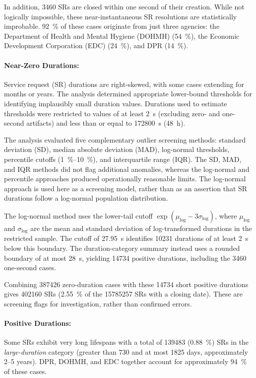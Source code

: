 \documentclass[linenumber]{jdsart}
\begin{document}
In addition, \num{3460} SRs are closed within one second of their 
creation. While not logically impossible, these near-instantaneous 
SR resolutions are statistically improbable. \SI{92}{\percent} of these cases 
originate from just three agencies: the Department of Health and 
Mental Hygiene (DOHMH) (\SI{54}{\percent}), the Economic Development
Corporation (EDC) (\SI{24}{\percent}), and DPR (\SI{14}{\percent}).

\paragraph{Near-Zero Durations:}
\label{par:suspiciousdurations}
Service request (\textsc{SR}) durations are right-skewed,
with some cases extending for months or years.
The analysis determined appropriate lower-bound thresholds
for identifying implausibly small duration values.
Durations used to estimate thresholds were restricted to values of at least
\SI{2}{\second} (excluding zero- and one-second artifacts)
and less than or equal to \SI{172800}{\second}
(\SI{48}{\hour}). 

The analysis evaluated five complementary outlier screening methods:
standard deviation (SD), median absolute deviation (MAD),
log-normal thresholds, percentile cutoffs
(\SIrange{1}{10}{\percent}), and interquartile range (IQR).
The SD, MAD, and IQR methods did not flag additional anomalies,
whereas the log-normal and percentile approaches produced
operationally reasonable limits. The log-normal approach is 
used here as a screening model, rather than as an assertion 
that SR durations follow a log-normal population distribution.

The log-normal method uses the lower-tail cutoff
$\exp(\mu_{\log} - 3\sigma_{\log})$, where $\mu_{\log}$ and
$\sigma_{\log}$ are the mean and standard deviation of log-transformed
durations in the restricted sample. The cutoff of \SI{27.95}{\second}
identifies \num{10231} durations of at least \SI{2}{\second} below
this boundary. The duration-category summary instead uses a rounded
boundary of at most \SI{28}{\second}, yielding \num{14734} positive
durations, including the \num{3460} one-second cases.

Combining \num{387426} zero-duration cases with these \num{14734}
short positive durations gives \num{402160} SRs
(\SI{2.55}{\percent} of the \num{15785257} SRs with a closing date).
These are screening flags for investigation, rather than confirmed errors.

\paragraph{Positive Durations:}
\label{par:positivedurations}
Some SRs exhibit very long lifespans with a total of \num{139483}
(\SI[round-mode=places, round-precision=2]{0.88}{\percent})
SRs in the \emph{large-duration} category
(greater than 730 and at most \num{1825} days, approximately 2--5 years).
DPR, DOHMH, and EDC together account for approximately
\SI{94}{\percent} of these cases. 
\end{document}
